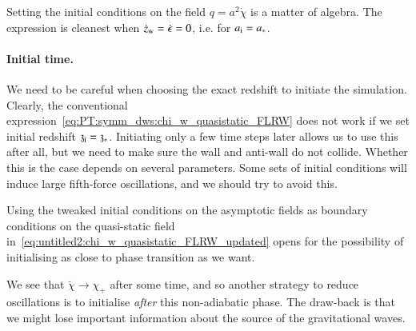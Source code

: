     



    Setting the initial conditions on the field $q = a^2 \dot{\chi}$ is a matter of algebra. The expression is cleanest when $\dot{z}_\mathrm{w}=\dot{\epsilon}=0$, i.e. for $a_\mathrm{i}=a_\ast$.  %




    








    \paragraph{Initial time.} %
    We need to be careful when choosing the exact redshift to initiate the simulation. Clearly, the conventional expression~\cref{eq:PT:symm_dws:chi_w_quasistatic_FLRW} does not work if we set initial redshift $\mathfrak{z}_\mathrm{i}=\mathfrak{z}_\ast$. Initiating only a few time steps later allows us to use this after all, but we need to make sure the wall and anti-wall do not collide. Whether this is the case depends on several parameters. Some sets of initial conditions will induce large fifth-force oscillations, and we should try to avoid this.

    Using the tweaked initial conditions on the asymptotic fields as boundary conditions on the quasi-static field in~\cref{eq:untitled2:chi_w_quasistatic_FLRW_updated} opens for the possibility of initialising as close to phase transition as we want. 
    
    We see that $\breve{\chi}\to \chi_+ $ after some time, and so another strategy to reduce oscillations is to initialise \emph{after} this non-adiabatic phase. The draw-back is that we might lose important information about the source of the gravitational waves.


